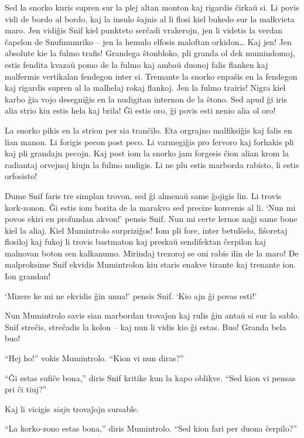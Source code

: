 Sed la snorko kuris supren sur la plej altan monton kaj rigardis ĉirkaŭ si. Li povis vidi de bordo al bordo, kaj la insulo ŝajnis al li flosi kiel bukedo sur la malkvieta maro. Jen vidiĝis Snif kiel punkteto serĉadi vrakerojn, jen li videtis la verdan ĉapelon de Snufmumriko -- jen la hemulo elfosis maloftan orkidon{\ldots} Kaj jen! Jen absolute kie la fulmo trafis! Grandega ŝtonbloko, pli granda ol dek mumindomoj, estis fendita kvazaŭ pomo de la fulmo kaj ambaŭ duonoj falis flanken kaj malfermis vertikalan fendegon inter si. Tremante la snorko enpaŝis en la fendegon kaj rigardis supren al la malhelaj rokaj flankoj. Jen la fulmo trairis! Nigra kiel karbo ĝia vojo desegniĝis en la nudigitan internon de la ŝtono. Sed apud ĝi iris alia strio kiu estis hela kaj brila! Ĝi estis oro, ĝi povis esti nenio alia ol oro!

La snorko pikis en la strion per sia tranĉilo. Eta orgrajno malfiksiĝis kaj falis en lian manon. Li forigis pecon post peco. Li varmegiĝis pro fervoro kaj forhakis pli kaj pli grandajn pecojn. Kaj post iom la snorko jam forgesis ĉion alian krom la radiantaj orvejnoj kiujn la fulmo nudigis. Li ne plu estis marborda rabisto, li estis orfosisto!

Dume Snif faris tre simplan trovon, sed ĝi almenaŭ same ĝojigis lin. Li trovis kork-zonon. Ĝi estis iom borita de la marakvo sed precize konvenis al li. `Nun mi povos ekiri en profundan akvon!' pensis Snif. Nun mi certe lernos naĝi same bone kiel la aliaj. Kiel Mumintrolo surpriziĝos! Iom pli fore, inter betulŝelo, fiŝoretaj flosiloj kaj fukoj li trovis bastmaton kaj preskaŭ sendifektan ĉerpilon kaj malnovan boton sen kalkanumo. Mirindaj trezoroj se oni rabis ilin de la maro! De malproksime Snif ekvidis Mumintrolon kiu staris enakve tirante kaj trenante ion. Ion grandan!

`Mizere ke mi ne ekvidis ĝin unua!' pensis Snif. `Kio ajn ĝi povas esti!'

Nun Mumintrolo savis sian marbordan trovaĵon kaj rulis ĝin antaŭ si sur la sablo. Snif streĉis, streĉadis la kolon -- kaj nun li vidis kio ĝi estas. Buo! Granda bela buo!

``Hej ho!'' vokis Mumintrolo. ``Kion vi nun diras?''

``Ĝi estas sufiĉe bona,'' diris Snif kritike kun la kapo oblikve. ``Sed kion vi pensas pri ĉi tiuj?''

Kaj li vicigis \emph{siajn} trovaĵojn sursable.

``La korko-zono estas bona,'' diris Mumintrolo. ``Sed kion fari per duona ĉerpilo?''

